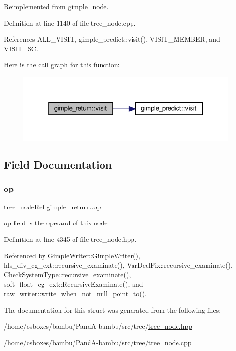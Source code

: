Reimplemented from \hyperlink{structgimple__node_a337b029a3aca9c1b96311b6e6668f7f3}{gimple\+\_\+node}.



Definition at line 1140 of file tree\+\_\+node.\+cpp.



References A\+L\+L\+\_\+\+V\+I\+S\+IT, gimple\+\_\+predict\+::visit(), V\+I\+S\+I\+T\+\_\+\+M\+E\+M\+B\+ER, and V\+I\+S\+I\+T\+\_\+\+SC.

Here is the call graph for this function\+:
\nopagebreak
\begin{figure}[H]
\begin{center}
\leavevmode
\includegraphics[width=319pt]{d9/df0/structgimple__return_a96de93cec9dfd2df931c05bfe673f532_cgraph}
\end{center}
\end{figure}


\subsection{Field Documentation}
\mbox{\label{structgimple__return_a48da47c569b1b859420fb0fecd9d7d0d}} 
\subsubsection{\texorpdfstring{op}{op}}
{\footnotesize\ttfamily \hyperlink{tree__node_8hpp_a6ee377554d1c4871ad66a337eaa67fd5}{tree\+\_\+node\+Ref} gimple\+\_\+return\+::op}



op field is the operand of this node 



Definition at line 4345 of file tree\+\_\+node.\+hpp.



Referenced by Gimple\+Writer\+::\+Gimple\+Writer(), hls\+\_\+div\+\_\+cg\+\_\+ext\+::recursive\+\_\+examinate(), Var\+Decl\+Fix\+::recursive\+\_\+examinate(), Check\+System\+Type\+::recursive\+\_\+examinate(), soft\+\_\+float\+\_\+cg\+\_\+ext\+::\+Recursive\+Examinate(), and raw\+\_\+writer\+::write\+\_\+when\+\_\+not\+\_\+null\+\_\+point\+\_\+to().



The documentation for this struct was generated from the following files\+:\begin{DoxyCompactItemize}
\item 
/home/osboxes/bambu/\+Pand\+A-\/bambu/src/tree/\hyperlink{tree__node_8hpp}{tree\+\_\+node.\+hpp}\item 
/home/osboxes/bambu/\+Pand\+A-\/bambu/src/tree/\hyperlink{tree__node_8cpp}{tree\+\_\+node.\+cpp}\end{DoxyCompactItemize}
